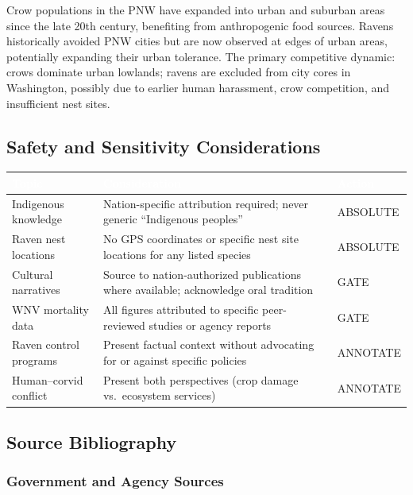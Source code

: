 \documentclass[11pt,letterpaper]{article}
\newcommand{\tableheader}[1]{\textbf{\sffamily\textcolor{white}{#1}}}
\begin{document}
Crow populations in the PNW have expanded into urban and suburban areas since the late 20th century, benefiting from anthropogenic food sources. Ravens historically avoided PNW cities but are now observed at edges of urban areas, potentially expanding their urban tolerance. The primary competitive dynamic: crows dominate urban lowlands; ravens are excluded from city cores in Washington, possibly due to earlier human harassment, crow competition, and insufficient nest sites.

\subsection{Safety and Sensitivity Considerations}

\begin{center}
\begin{tabularx}{\textwidth}{L{3.5cm}XC{2cm}}
\toprule
{}
\tableheader{Topic} & \tableheader{Consideration} & \tableheader{Action} \\
\midrule
Indigenous knowledge & Nation-specific attribution required; never generic ``Indigenous peoples'' & ABSOLUTE \\
Raven nest locations & No GPS coordinates or specific nest site locations for any listed species & ABSOLUTE \\
Cultural narratives & Source to nation-authorized publications where available; acknowledge oral tradition & GATE \\
WNV mortality data & All figures attributed to specific peer-reviewed studies or agency reports & GATE \\
Raven control programs & Present factual context without advocating for or against specific policies & ANNOTATE \\
Human--corvid conflict & Present both perspectives (crop damage vs.\ ecosystem services) & ANNOTATE \\
\bottomrule
\end{tabularx}
\end{center}

\subsection{Source Bibliography}

\subsubsection{Government and Agency Sources}
\end{document}
